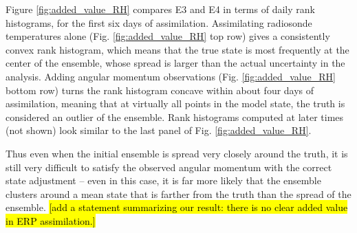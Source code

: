 Figure \ref{fig:added_value_RH} compares E3 and E4  in terms of daily rank histograms, for the first six days of assimilation.  
Assimilating radiosonde temperatures alone (Fig. \ref{fig:added_value_RH} top row) gives a consistently convex rank histogram, which means that the true state is most frequently at the center of the ensemble, whose spread is larger than the actual uncertainty in the analysis.  
Adding angular momentum observations (Fig. \ref{fig:added_value_RH} bottom row) turns the rank histogram concave within about four days of assimilation, meaning that at virtually all points in the model state, the truth is considered an outlier of the ensemble. 
Rank histograms computed at later times (not shown) look similar to the last panel of Fig. \ref{fig:added_value_RH}.  

Thus even when the initial ensemble is spread very closely around the truth, it is still very difficult to satisfy the observed angular momentum with the correct state adjustment -- even in this case, it is far more likely that the ensemble clusters around a mean state that is farther from the truth than the spread of the ensemble.  
\hl{[add a statement summarizing our result: there is no clear added value in ERP assimilation.]}
